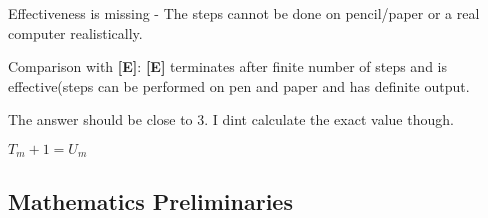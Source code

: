 \documentclass[12pt]{article}
\begin{document}
\begin{enumerate}
\begin{item}
\begin{itemize}
    \begin{item}
      Effectiveness is missing - The steps cannot be done on pencil/paper or a real computer realistically.
    \end {item}

    Comparison with {\bf[E]}:
    {\bf[E]} terminates after finite number of steps and is effective(steps can be performed on pen and paper and has definite output.
  \end{itemize}
\end{item}

\begin{item}

 The answer should be close to 3. I dint calculate the exact value though.
  
\end{item}

\begin{item}

  $T_{m} +1 = U_{m}$

\end{item}


\end{enumerate}

\subsection{Mathematics Preliminaries}
\end{document}
